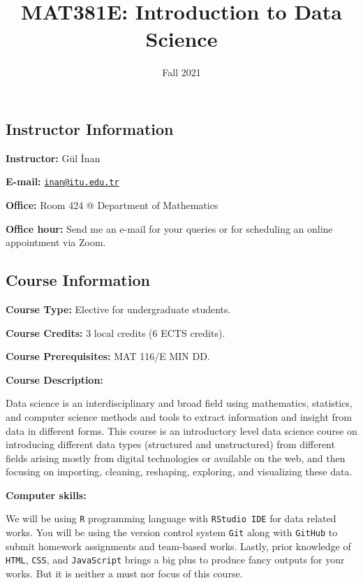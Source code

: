 \documentclass[
  12pt,
]{article}
\title{MAT381E: Introduction to Data Science}
\author{}
\date{\vspace{-2.5em}Fall 2021}
\begin{document}
\maketitle

\hypertarget{instructor-information}{%
\subsection{Instructor Information}\label{instructor-information}}

\textbf{Instructor:} Gül İnan

\textbf{E-mail:}
\href{mailto:inan@itu.edu.tr}{\nolinkurl{inan@itu.edu.tr}}

\textbf{Office:} Room 424 @ Department of Mathematics

\textbf{Office hour:} Send me an e-mail for your queries or for
scheduling an online appointment via Zoom.

\hypertarget{course-information}{%
\subsection{Course Information}\label{course-information}}

\textbf{Course Type:} Elective for undergraduate students.

\textbf{Course Credits:} 3 local credits (6 ECTS credits).

\textbf{Course Prerequisites:} MAT 116/E MIN DD.

\textbf{Course Description:}

Data science is an interdisciplinary and broad field using mathematics,
statistics, and computer science methods and tools to extract
information and insight from data in different forms. This course is an
introductory level data science course on introducing different data
types (structured and unstructured) from different fields arising mostly
from digital technologies or available on the web, and then focusing on
importing, cleaning, reshaping, exploring, and visualizing these data.

\textbf{Computer skills:}

We will be using \texttt{R} programming language with
\texttt{RStudio\ IDE} for data related works. You will be using the
version control system \texttt{Git} along with \texttt{GitHub} to submit
homework assignments and team-based works. Lastly, prior knowledge of
\texttt{HTML}, \texttt{CSS}, and \texttt{JavaScript} brings a big plus
to produce fancy outputs for your works. But it is neither a must nor
focus of this course.
\end{document}

